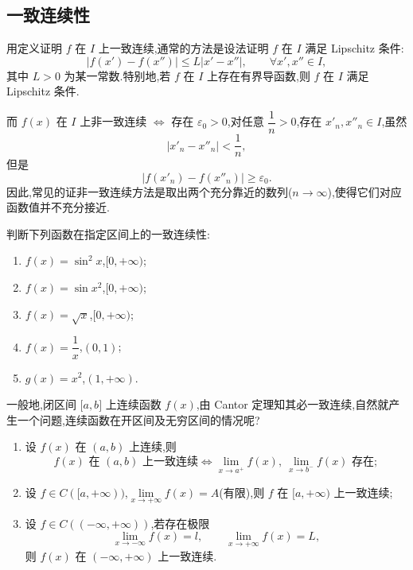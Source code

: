 \documentclass[../数学分析培优讲义.tex]{subfiles}
\begin{document}
\newpage

\subsection{一致连续性}

用定义证明 $f$ 在 $I$ 上一致连续,通常的方法是设法证明 $f$ 在 $I$ 满足 Lipschitz 条件:
\[
    |f(x')-f(x'')|\leq L|x'-x''|,
    \qquad \forall x',x''\in I,
\]
其中 $L>0$ 为某一常数.特别地,若 $f$ 在 $I$ 上存在有界导函数,则 $f$ 在 $I$ 满足 Lipschitz 条件.

而 $f(x)$ 在 $I$ 上非一致连续 $\Longleftrightarrow$ 存在 $\varepsilon_0>0$,对任意 $\dfrac{1}{n}>0$,存在 $x'_n,x''_n\in I$,虽然
\[
    |x'_n-x''_n|<\dfrac{1}{n},
\]
但是
\[
    |f(x'_n)-f(x''_n)|\geq\varepsilon_0.
\]
因此,常见的证非一致连续方法是取出两个充分靠近的数列($n\to\infty$),使得它们对应函数值并不充分接近.

\begin{example}
判断下列函数在指定区间上的一致连续性:
\begin{enumerate}[label=(\arabic*)]
    \item $f(x)=\sin^2x$,$\lbrack 0,+\infty)$;
    \item $f(x)=\sin x^2$,$\lbrack 0,+\infty)$;
    \item $f(x)=\sqrt{x}$,$\lbrack 0,+\infty)$;
    \item $f(x)=\dfrac{1}{x}$,$(0,1)$;
    \item $g(x)=x^2$,$(1,+\infty)$.
\end{enumerate}
\end{example}
\exampleblank

一般地,闭区间 $\lbrack a,b\rbrack$ 上连续函数 $f(x)$,由 Cantor 定理知其必一致连续,自然就产生一个问题,连续函数在开区间及无穷区间的情况呢?

\begin{theorem}[\markstar]
\begin{enumerate}[label=(\arabic*)]
    \item 设 $f(x)$ 在 $(a,b)$ 上连续,则
    \[
        f(x)\text{ 在 }(a,b)\text{ 上一致连续}
        \Longleftrightarrow
        \lim\limits_{x\to a^+}f(x),\ \lim\limits_{x\to b^-}f(x)\text{ 存在};
    \]
    \item 设 $f\in C(\lbrack a,+\infty))$,$\displaystyle\lim\limits_{x\to+\infty}f(x)=A$(有限),则 $f$ 在 $\lbrack a,+\infty)$ 上一致连续;
    \item 设 $f\in C(( -\infty,+\infty))$,若存在极限
    \[
        \lim\limits_{x\to-\infty}f(x)=l,
        \qquad
        \lim\limits_{x\to+\infty}f(x)=L,
    \]
    则 $f(x)$ 在 $(-\infty,+\infty)$ 上一致连续.
\end{enumerate}
\end{theorem}
\end{document}
